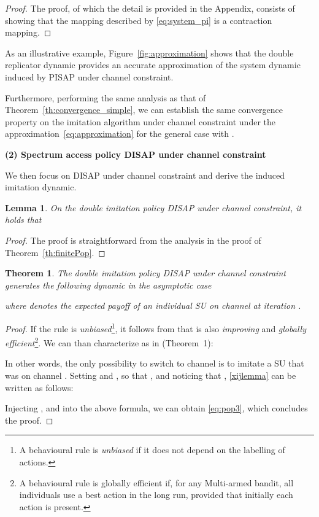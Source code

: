\documentclass[12pt, onecolumn]{IEEEtran}
\theoremstyle{plain}
\newtheorem{lemma}{Lemma}
\newtheorem{theorem}{Theorem}
\theoremstyle{definition}
\begin{document}
\begin{proof}
The proof, of which the detail is provided in the Appendix, consists of showing that the mapping described by \eqref{eq:system_pi} is a contraction mapping.
\end{proof}

As an illustrative example, Figure~\ref{fig:approximation} shows that the double replicator dynamic provides an accurate approximation of the system dynamic induced by PISAP under channel constraint.









Furthermore, performing the same analysis as that of Theorem~\ref{th:convergence_simple}, we can establish the same convergence property on the imitation algorithm under channel constraint under the approximation~\eqref{eq:approximation} for the general case with .

\noindent \textbf{(2) Spectrum access policy DISAP under channel constraint}

We then focus on DISAP under channel constraint and derive the induced imitation dynamic.

\begin{lemma}
On the double imitation policy DISAP under channel constraint, it holds that

\label{lemma:pop3}
\end{lemma}
\begin{proof}
The proof is straightforward from the analysis in the proof of Theorem~\ref{th:finitePop}.
\end{proof}






\begin{theorem}
The double imitation policy DISAP under channel constraint generates the following dynamic in the asymptotic case

where  denotes the expected payoff of an individual SU on channel  at iteration .
\label{th:pop3}
\end{theorem}


\begin{proof}
If the rule  is {\it unbiased}\footnote{A behavioural rule is {\it unbiased} if it does not depend on the labelling of actions.}, it follows from \cite{Schlag99} that  is also {\it improving}
and {\it globally efficient}\footnote{A behavioural rule is globally efficient if, for any Multi-armed bandit, all individuals use a best action in the long run, provided that initially
each action is present.}. We can than characterize  as in \cite{Schlag99} (Theorem~1):



In other words, the only possibility to switch to channel  is to imitate a SU that was on channel .
Setting  and , so that , and noticing that , \eqref{xijlemma} can be written as follows:


Injecting ,  and  into the above formula, we can obtain \eqref{eq:pop3}, which concludes the proof.
\end{proof}
\end{document}
